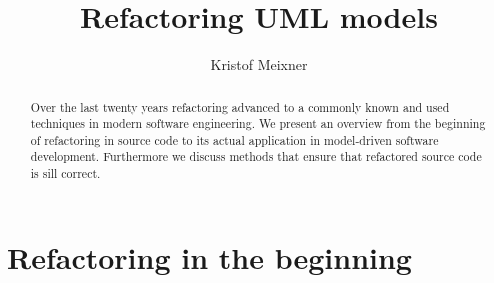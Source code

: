 \documentclass{llncs}
\begin{document}
\pagestyle{plain}

\title{Refactoring UML models}


\author{Kristof Meixner}




\maketitle

\begin{abstract}
Over the last twenty years refactoring advanced to a commonly known and used techniques in modern software engineering. We present an overview from the beginning of refactoring in source code to its actual application in model-driven software development. Furthermore we discuss methods that ensure that refactored source code is sill correct.
\end{abstract}

\tableofcontents
\newpage


\section{Refactoring in the beginning}
\end{document}
